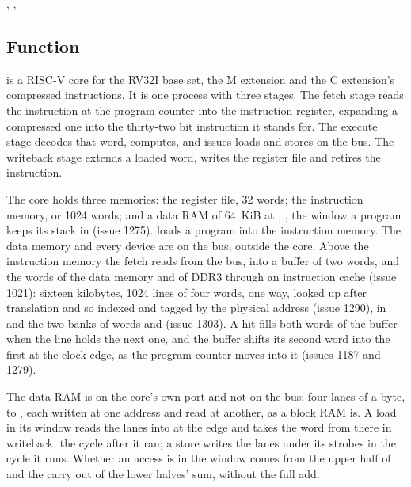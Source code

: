 
%
{, , }

\subsection*{Function}

 is a RISC-V core for the RV32I base set, the M
extension and the C extension's compressed instructions. It is one
process with three stages. The fetch stage reads the instruction at
the program counter into the instruction register, expanding a
compressed one into the thirty-two bit instruction it stands for. The
execute stage decodes that word, computes, and issues
loads and stores on the bus. The writeback stage extends a loaded
word, writes the register file and retires the instruction.

The core holds three memories: the register file, 32 words; the
instruction memory,  or 1024 words; and a data RAM
of 64~KiB at , , the window a program
keeps its stack in (issue 1275).  loads a program
into the instruction memory. The data memory and every device are on
the bus, outside the core. Above
the instruction memory the fetch reads from the bus, into a buffer of
two words, and the words of the data memory and of DDR3 through an
instruction cache (issue 1021): sixteen kilobytes, 1024 lines of
four words, one way, looked up after translation and so indexed and
tagged by the physical address (issue 1290), in  and
the two banks of words  and  (issue 1303). A hit fills both words of the buffer when the line
holds the next one, and the buffer shifts its second word into the
first at the clock edge, as the program counter moves into it
(issues 1187 and 1279).

The data RAM is on the core's own port and not on the bus: four lanes
of a byte,  to , each written at one address and
read at another, as a block RAM is. A load in its window reads the
lanes into  at the edge and takes the word from there in
writeback, the cycle after it ran; a store writes the lanes under its
strobes in the cycle it runs. Whether an access is in the window comes
from the upper half of  and the carry out of the lower
halves' sum, without the full add.

